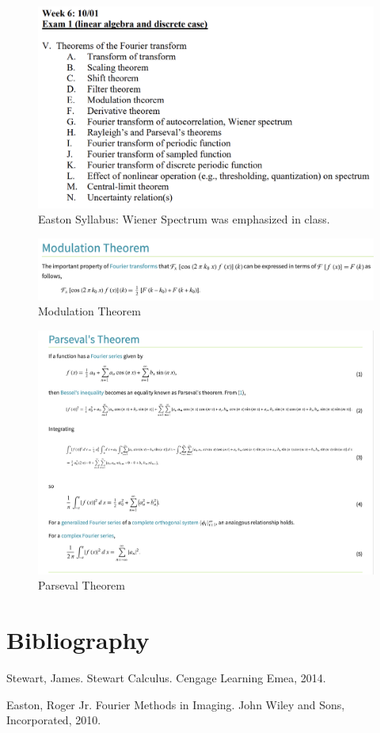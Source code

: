 \documentclass{article}
\begin{document}
\begin{figure}[h!]
\centering
\includegraphics[scale=.65]{Fourier/Week 6/Week6.1.png}
\caption{Easton Syllabus: Wiener Spectrum was emphasized in class.}
\label{fig:Syllabus6}
\end{figure}

\begin{figure}[h!]
\centering
\includegraphics[scale=.55]{Fourier/Week 6/Notes/Modulation.png}
\caption{Modulation Theorem}
\label{fig:Modulation}
\end{figure}

\begin{figure}[h!]
\centering
\includegraphics[scale=.55]{Fourier/Week 6/Notes/Parseval.png}
\caption{Parseval Theorem}
\label{fig:Parseval}
\end{figure}




\clearpage
\section{Bibliography}
\begin{thebibliography}{}

Stewart, James. Stewart Calculus. Cengage Learning Emea, 2014.

Easton, Roger Jr. Fourier Methods in Imaging. John Wiley and Sons, Incorporated, 2010.


\end{thebibliography}
\end{document}

